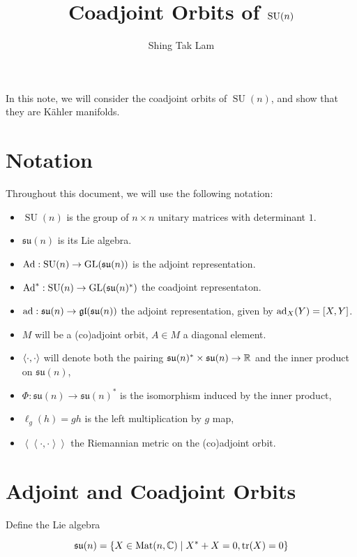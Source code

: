 \documentclass{article}
\title{Coadjoint Orbits of \(\SU(n)\)}
\author{Shing Tak Lam}
\DeclareMathOperator{\SU}{SU}
\newcommand{\su}{\mathfrak{su}}
\newcommand{\iinner}[1]{\left\langle\!\left\langle #1 \right\rangle\!\right\rangle}
\begin{document}
\maketitle

In this note, we will consider the coadjoint orbits of \(\SU(n)\), and show that they are K\"ahler manifolds.

\tableofcontents

\section*{Notation}

Throughout this document, we will use the following notation:

\begin{itemize}
    \item \(\SU(n)\) is the group of \(n \times n\) unitary matrices with determinant \(1\).
    \item \(\su(n)\) is its Lie algebra.
    \item \(\Ad : \SU(n) \to \GL(\su(n))\) is the adjoint representation.
    \item \(\Ad^* : \SU(n) \to \GL(\su(n)^*)\) the coadjoint representaton.
    \item \(\ad : \su(n) \to \gl(\su(n))\) the adjoint representation, given by \(\operatorname{ad}_X(Y) = [X, Y]\).
    \item \(M\) will be a (co)adjoint orbit, \(A \in M\) a diagonal element.
    \item \(\left\langle \cdot, \cdot \right\rangle\) will denote both the pairing \(\su(n)^* \times \su(n) \to \R\) and the inner product on \(\su(n)\),
    \item \(\Phi : \su(n) \to \su(n)^*\) is the isomorphism induced by the inner product,
    \item \(\ell_g(h) = gh\) is the left multiplication by \(g\) map,
    \item \(\iinner{\cdot, \cdot}\) the Riemannian metric on the (co)adjoint orbit.
\end{itemize}

\section{Adjoint and Coadjoint Orbits}

Define the Lie algebra

\begin{equation}
    \label{eq:sun-def}
    \su(n) = \left\{X \in \Mat(n, \C) \mid X^* + X = 0, \tr(X) = 0\right\}
\end{equation}
\end{document}
